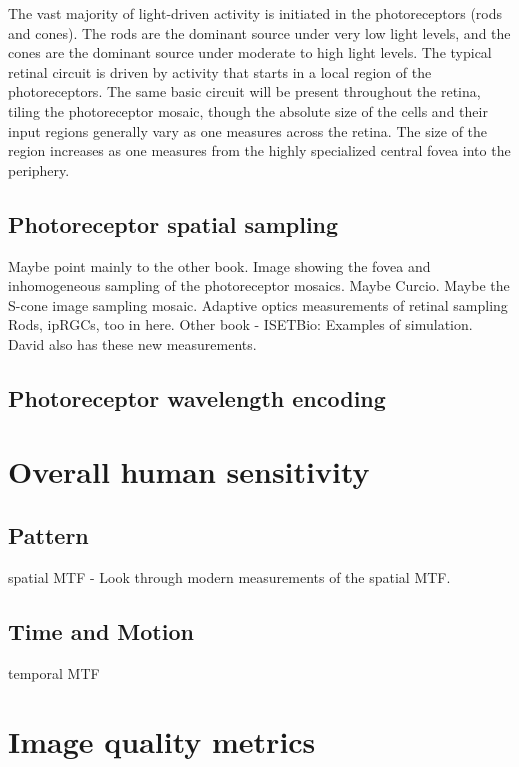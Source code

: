 \documentclass[
  letterpaper,
]{book}
\begin{document}
The vast majority of light-driven activity is initiated in the
photoreceptors (rods and cones). The rods are the dominant source under
very low light levels, and the cones are the dominant source under
moderate to high light levels. The typical retinal circuit is driven by
activity that starts in a local region of the photoreceptors. The same
basic circuit will be present throughout the retina, tiling the
photoreceptor mosaic, though the absolute size of the cells and their
input regions generally vary as one measures across the retina. The size
of the region increases as one measures from the highly specialized
central fovea into the periphery.

\subsection{Photoreceptor spatial
sampling}\label{photoreceptor-spatial-sampling}

Maybe point mainly to the other book. Image showing the fovea and
inhomogeneous sampling of the photoreceptor mosaics. Maybe Curcio. Maybe
the S-cone image sampling mosaic. Adaptive optics measurements of
retinal sampling Rods, ipRGCs, too in here. Other book - ISETBio:
Examples of simulation. David also has these new measurements.

\subsection{Photoreceptor wavelength
encoding}\label{photoreceptor-wavelength-encoding}

\section{Overall human sensitivity}\label{overall-human-sensitivity}

\subsection{Pattern}\label{pattern}

spatial MTF - Look through modern measurements of the spatial MTF.

\subsection{Time and Motion}\label{time-and-motion}

temporal MTF

\section{Image quality metrics}\label{sec-human-imagequality}
\end{document}
